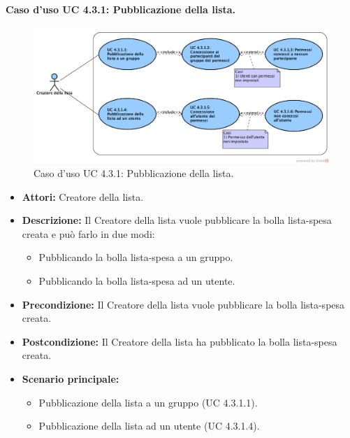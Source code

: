 \newpage
\paragraph{Caso d'uso UC 4.3.1: Pubblicazione della lista.}
\label{Caso d'uso UC 4.3.1: Pubblicazione della lista.}

\begin{figure}[ht]
	\centering
	\includegraphics[scale=0.45]{Usecases/img/UC4.3.1.png}
	\caption{Caso d'uso UC 4.3.1: Pubblicazione della lista.}
\end{figure}

\FloatBarrier
\begin{itemize}
\item \textbf{Attori:} Creatore della lista.
\item \textbf{Descrizione:} Il Creatore della lista vuole pubblicare la bolla lista-spesa creata e può farlo in due modi:
\begin{itemize}
\item Pubblicando la bolla lista-spesa a un gruppo.
\item Pubblicando la bolla lista-spesa ad un utente.
\end{itemize}
\item \textbf{Precondizione:} Il Creatore della lista vuole pubblicare la bolla lista-spesa creata. 
\item \textbf{Postcondizione:} Il Creatore della lista ha pubblicato la bolla lista-spesa creata.
\item \textbf{Scenario principale:}
	\begin{itemize}
	\item{Pubblicazione della lista a un gruppo (UC 4.3.1.1).}
	\item{Pubblicazione della lista ad un utente (UC 4.3.1.4).}
	\end{itemize}
\end{itemize}